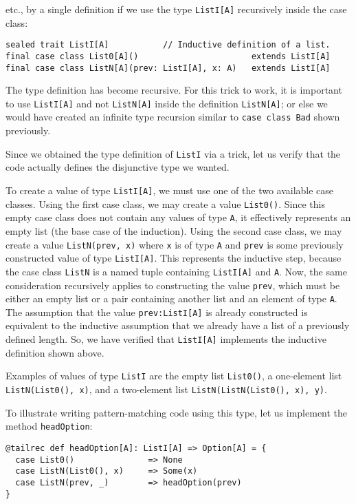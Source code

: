 etc., by a single definition if we use the type \lstinline!ListI[A]!
recursively inside the case class:
\begin{lstlisting}
sealed trait ListI[A]           // Inductive definition of a list.
final case class List0[A]()                       extends ListI[A]
final case class ListN[A](prev: ListI[A], x: A)   extends ListI[A]
\end{lstlisting}
The type definition has become recursive. For this trick to work,
it is important to use \lstinline!ListI[A]! and not \lstinline!ListN[A]!
inside the definition \lstinline!ListN[A]!; or else we would have
created an infinite type recursion
similar to \lstinline!case class Bad! shown previously.

Since we obtained the type definition of \lstinline!ListI! via a
trick, let us verify that the code actually defines the disjunctive
type we wanted. 

To create a value of type \lstinline!ListI[A]!, we must use one of
the two available case classes. Using the first case class, we may
create a value \lstinline!List0()!. Since this empty case class does
not contain any values of type \lstinline!A!, it effectively represents
an empty list (the base case of the induction). Using the second case
class, we may create a value \lstinline!ListN(prev, x)! where \lstinline!x!
is of type \lstinline!A! and \lstinline!prev! is some previously
constructed value of type \lstinline!ListI[A]!. This represents the
inductive step, because the case class \lstinline!ListN! is a named
tuple containing \lstinline!ListI[A]! and \lstinline!A!. Now, the
same consideration recursively applies to constructing the value \lstinline!prev!,
which must be either an empty list or a pair containing another list
and an element of type \lstinline!A!. The assumption that the value
\lstinline!prev:ListI[A]! is already constructed is equivalent to
the inductive assumption that we already have a list of a previously
defined length. So, we have verified that \lstinline!ListI[A]! implements
the inductive definition shown above.

Examples of values of type \lstinline!ListI! are the empty list \lstinline!List0()!,
a one-element list \lstinline!ListN(List0(), x)!, and a two-element
list \lstinline!ListN(ListN(List0(), x), y)!.

To illustrate writing pattern-matching code using this type, let us
implement the method \lstinline!headOption!:
\begin{lstlisting}
@tailrec def headOption[A]: ListI[A] => Option[A] = {
  case List0()               => None
  case ListN(List0(), x)     => Some(x)
  case ListN(prev, _)        => headOption(prev)
}
\end{lstlisting}

